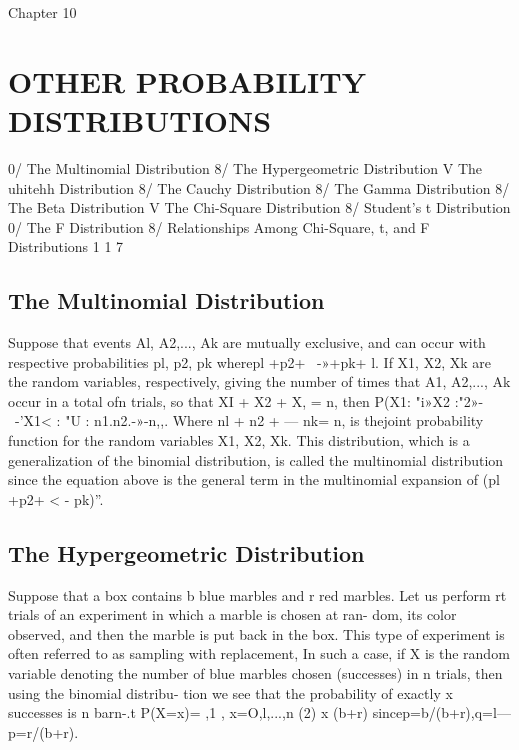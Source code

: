 



Chapter 10
\chapter{OTHER PROBABILITY DISTRIBUTIONS}

0/ The Multinomial Distribution
8/ The Hypergeometric Distribution
V The uhitehh Distribution
8/ The Cauchy Distribution
8/ The Gamma Distribution
8/ The Beta Distribution
V The Chi-Square Distribution
8/ Student’s t Distribution
0/ The F Distribution
8/ Relationships Among Chi-Square, t,
and F Distributions
1 1 7

\section{The Multinomial Distribution}
Suppose that events Al, A2,..., Ak are mutually exclusive, and can occur
with respective probabilities pl, p2,  pk wherepl +p2+ ~-»+pk+ l. If
X1, X2,  Xk are the random variables, respectively, giving the number
of times that A1, A2,..., Ak occur in a total ofn trials, so that XI + X2 +
 X, = n, then
P(X1: "i»X2 :"2»-~-’X1< : "U : %
n1.n2.-»-n,,.
Where nl + n2 + --- nk= n, is thejoint probability function for the random
variables X1, X2,  Xk.
This distribution, which is a generalization of the binomial distribution, is called the multinomial distribution since the equation above is the general term in the multinomial expansion of (pl +p2+ < - pk)”.
\section{The Hypergeometric Distribution}
Suppose that a box contains b blue marbles and r red marbles. Let us
perform rt trials of an experiment in which a marble is chosen at ran-
dom, its color observed, and then the marble is put back in the box. This
type of experiment is often referred to as sampling with replacement, In
such a case, if X is the random variable denoting the number of blue
marbles chosen (successes) in n trials, then using the binomial distribu-
tion we see that the probability of exactly x successes is
n barn-.t
P(X=x)= ,1 , x=O,l,...,n (2)
x (b+r)
sincep=b/(b+r),q=l—p=r/(b+r).

